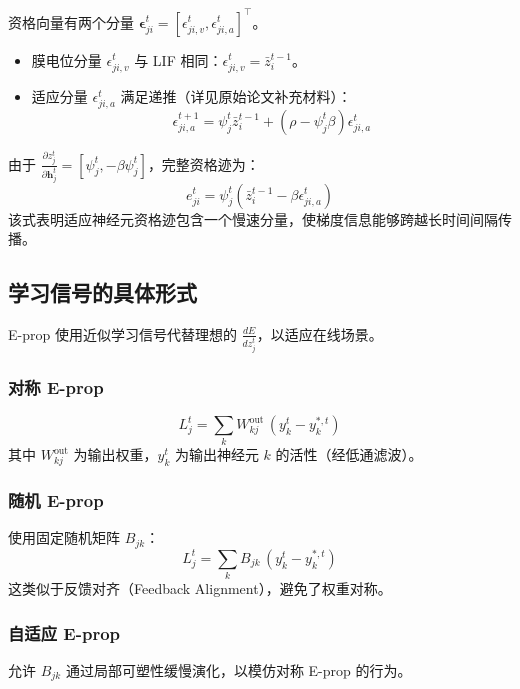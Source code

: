 \documentclass{article}
\begin{document}
资格向量有两个分量 $\boldsymbol{\epsilon}_{ji}^t = [\epsilon_{ji,v}^t, \epsilon_{ji,a}^t]^\top$。
\begin{itemize}
    \item 膜电位分量 $\epsilon_{ji,v}^t$ 与 LIF 相同：$\epsilon_{ji,v}^t = \bar{z}_i^{t-1}$。
    \item 适应分量 $\epsilon_{ji,a}^t$ 满足递推（详见原始论文补充材料）：
    \begin{equation}
    \boxed{
    \epsilon_{ji,a}^{t+1} = \psi_j^t \bar{z}_i^{t-1} + (\rho - \psi_j^t \beta) \epsilon_{ji,a}^t
    }
    \label{eq:eprop_alif_epsilon_a_rec}
    \end{equation}
\end{itemize}
由于 $\frac{\partial z_j^t}{\partial \mathbf{h}_j^t} = [\psi_j^t, -\beta \psi_j^t]$，完整资格迹为：
\begin{equation}
\boxed{
e_{ji}^t = \psi_j^t \left( \bar{z}_i^{t-1} - \beta \epsilon_{ji,a}^t \right)
}
\label{eq:eprop_alif_e}
\end{equation}
该式表明适应神经元资格迹包含一个慢速分量，使梯度信息能够跨越长时间间隔传播。

\subsection{学习信号的具体形式}

E-prop 使用近似学习信号代替理想的 $\frac{dE}{dz_j^t}$，以适应在线场景。

\subsubsection{对称 E-prop}
\begin{equation}
L_j^t = \sum_k W_{kj}^{\text{out}} \, (y_k^t - y_k^{*,t})
\label{eq:eprop_sym}
\end{equation}
其中 $W_{kj}^{\text{out}}$ 为输出权重，$y_k^t$ 为输出神经元 $k$ 的活性（经低通滤波）。

\subsubsection{随机 E-prop}
使用固定随机矩阵 $B_{jk}$：
\begin{equation}
L_j^t = \sum_k B_{jk} \, (y_k^t - y_k^{*,t})
\label{eq:eprop_random}
\end{equation}
这类似于反馈对齐（Feedback Alignment），避免了权重对称。

\subsubsection{自适应 E-prop}
允许 $B_{jk}$ 通过局部可塑性缓慢演化，以模仿对称 E-prop 的行为。
\end{document}
